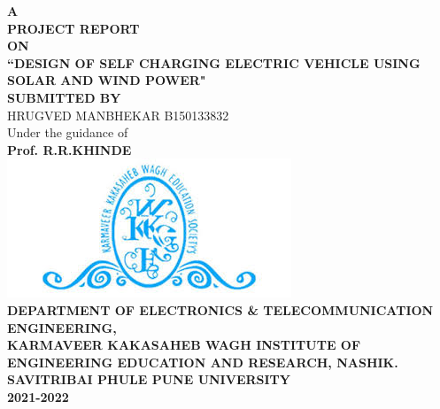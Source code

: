 \documentclass[a4paper,12pt]{article}
\begin{document}
\begin{center}
\Large\textbf{\scshape A}\\
\Large\textbf{\scshape PROJECT REPORT}\\
\Large\textbf{\scshape ON}\\[1.5cm]
\vspace{0.1in}
\LARGE\textbf{“DESIGN OF SELF CHARGING ELECTRIC VEHICLE USING SOLAR AND WIND POWER"}\\[1.5cm]
\large\textbf{SUBMITTED BY}\\[1cm] 
HRUGVED MANBHEKAR \hspace{6.25cm} B150133832\\[1cm]
Under the guidance of\\[0.16cm]
\Large\textbf{Prof. R.R.KHINDE}\\[0.5cm]
\includegraphics[scale=0.5]{logo.jpg}\\
\Large\textbf{\scshape DEPARTMENT OF ELECTRONICS \& TELECOMMUNICATION ENGINEERING,}\\[0.75cm]
\Large\scshape\textbf{\scshape KARMAVEER KAKASAHEB WAGH INSTITUTE OF ENGINEERING EDUCATION AND RESEARCH, NASHIK.}\\[0.75cm]
\Large\textbf{\scshape SAVITRIBAI PHULE PUNE UNIVERSITY}\\[0.75cm]
\Large\textbf{\scshape 2021-2022}\\
\end{center}
\end{document}

